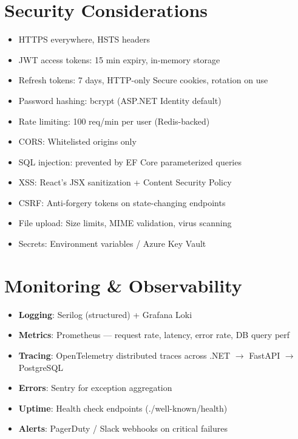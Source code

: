 \documentclass[12pt,a4paper,twoside]{report}
\begin{document}
\section{Security Considerations}
\begin{itemize}
    \item HTTPS everywhere, HSTS headers
    \item JWT access tokens: 15 min expiry, in-memory storage
    \item Refresh tokens: 7 days, HTTP-only Secure cookies, rotation on use
    \item Password hashing: bcrypt (ASP.NET Identity default)
    \item Rate limiting: 100 req/min per user (Redis-backed)
    \item CORS: Whitelisted origins only
    \item SQL injection: prevented by EF Core parameterized queries
    \item XSS: React's JSX sanitization + Content Security Policy
    \item CSRF: Anti-forgery tokens on state-changing endpoints
    \item File upload: Size limits, MIME validation, virus scanning
    \item Secrets: Environment variables / Azure Key Vault
\end{itemize}

\section{Monitoring \& Observability}
\begin{itemize}
    \item \textbf{Logging}: Serilog (structured) + Grafana Loki
    \item \textbf{Metrics}: Prometheus --- request rate, latency, error rate, DB query perf
    \item \textbf{Tracing}: OpenTelemetry distributed traces across .NET $\to$ FastAPI $\to$ PostgreSQL
    \item \textbf{Errors}: Sentry for exception aggregation
    \item \textbf{Uptime}: Health check endpoints (./well-known/health)
    \item \textbf{Alerts}: PagerDuty / Slack webhooks on critical failures
\end{itemize}
\end{document}
